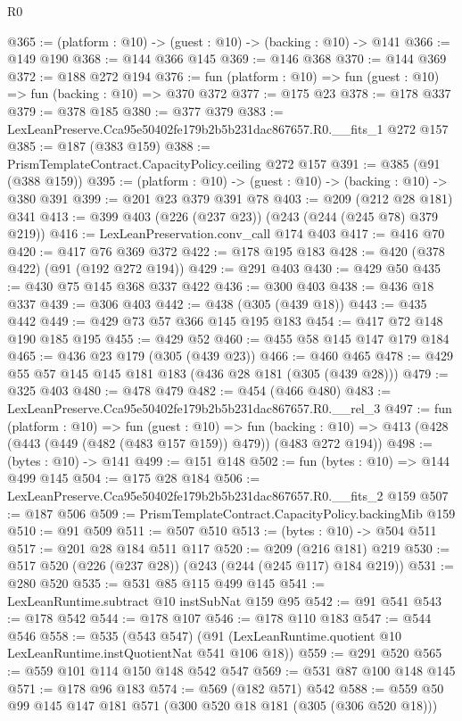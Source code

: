 \begin{lexlean}{R0}
\begin{coremodule}
@365 := (platform : @10) -> (guest : @10) -> (backing : @10) -> @141
@366 := @149 @190
@368 := @144 @366 @145
@369 := @146 @368
@370 := @144 @369
@372 := @188 @272 @194
@376 := fun (platform : @10) => fun (guest : @10) => fun (backing : @10) => @370 @372
@377 := @175 @23
@378 := @178 @337
@379 := @378 @185
@380 := @377 @379
@383 := LexLeanPreserve.Cca95e50402fe179b2b5b231dac867657.R0.__fits_1 @272 @157
@385 := @187 (@383 @159)
@388 := PrismTemplateContract.CapacityPolicy.ceiling @272 @157
@391 := @385 (@91 (@388 @159))
@395 := (platform : @10) -> (guest : @10) -> (backing : @10) -> @380 @391
@399 := @201 @23 @379 @391 @78
@403 := @209 (@212 @28 @181) @341
@413 := @399 @403 (@226 (@237 @23)) (@243 (@244 (@245 @78) @379 @219))
@416 := LexLeanPreservation.conv_call @174 @403
@417 := @416 @70
@420 := @417 @76 @369 @372
@422 := @178 @195 @183
@428 := @420 (@378 @422) (@91 (@192 @272 @194))
@429 := @291 @403
@430 := @429 @50
@435 := @430 @75 @145 @368 @337 @422
@436 := @300 @403
@438 := @436 @18 @337
@439 := @306 @403
@442 := @438 (@305 (@439 @18))
@443 := @435 @442
@449 := @429 @73 @57 @366 @145 @195 @183
@454 := @417 @72 @148 @190 @185 @195
@455 := @429 @52
@460 := @455 @58 @145 @147 @179 @184
@465 := @436 @23 @179 (@305 (@439 @23))
@466 := @460 @465
@478 := @429 @55 @57 @145 @145 @181 @183 (@436 @28 @181 (@305 (@439 @28)))
@479 := @325 @403
@480 := @478 @479
@482 := @454 (@466 @480)
@483 := LexLeanPreserve.Cca95e50402fe179b2b5b231dac867657.R0.__rel_3
@497 := fun (platform : @10) =>
  fun (guest : @10) =>
  fun (backing : @10) => @413 (@428 (@443 (@449 (@482 (@483 @157 @159)) @479)) (@483 @272 @194))
@498 := (bytes : @10) -> @141
@499 := @151 @148
@502 := fun (bytes : @10) => @144 @499 @145
@504 := @175 @28 @184
@506 := LexLeanPreserve.Cca95e50402fe179b2b5b231dac867657.R0.__fits_2 @159
@507 := @187 @506
@509 := PrismTemplateContract.CapacityPolicy.backingMib @159
@510 := @91 @509
@511 := @507 @510
@513 := (bytes : @10) -> @504 @511
@517 := @201 @28 @184 @511 @117
@520 := @209 (@216 @181) @219
@530 := @517 @520 (@226 (@237 @28)) (@243 (@244 (@245 @117) @184 @219))
@531 := @280 @520
@535 := @531 @85 @115 @499 @145
@541 := LexLeanRuntime.subtract @10 instSubNat @159 @95
@542 := @91 @541
@543 := @178 @542
@544 := @178 @107
@546 := @178 @110 @183
@547 := @544 @546
@558 := @535
    (@543 @547)
    (@91 (LexLeanRuntime.quotient @10 LexLeanRuntime.instQuotientNat @541 @106 @18))
@559 := @291 @520
@565 := @559 @101 @114 @150 @148 @542 @547
@569 := @531 @87 @100 @148 @145
@571 := @178 @96 @183
@574 := @569 (@182 @571) @542
@588 := @559 @50 @99 @145 @147 @181 @571 (@300 @520 @18 @181 (@305 (@306 @520 @18)))

\end{coremodule}
\end{lexlean}
